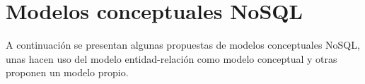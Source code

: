 \section{Modelos conceptuales NoSQL}
A continuación se presentan algunas propuestas de modelos conceptuales NoSQL, unas hacen uso del modelo entidad-relación como modelo conceptual y otras proponen un modelo propio.
